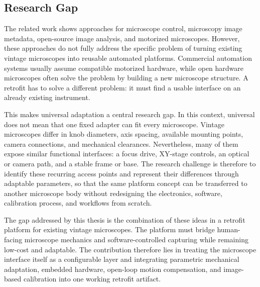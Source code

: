 \subsection{Research Gap}

The related work shows approaches for microscope control, microscopy image metadata, open-source image analysis, and motorized microscopes. However, these approaches do not fully address the specific problem of turning existing vintage microscopes into reusable automated platforms. Commercial automation systems usually assume compatible motorized hardware, while open hardware microscopes often solve the problem by building a new microscope structure. A retrofit has to solve a different problem: it must find a usable interface on an already existing instrument.

This makes universal adaptation a central research gap. In this context, universal does not mean that one fixed adapter can fit every microscope. Vintage microscopes differ in knob diameters, axis spacing, available mounting points, camera connections, and mechanical clearances. Nevertheless, many of them expose similar functional interfaces: a focus drive, XY-stage controls, an optical or camera path, and a stable frame or base. The research challenge is therefore to identify these recurring access points and represent their differences through adaptable parameters, so that the same platform concept can be transferred to another microscope body without redesigning the electronics, software, calibration process, and workflows from scratch.

The gap addressed by this thesis is the combination of these ideas in a retrofit platform for existing vintage microscopes. The platform must bridge human-facing microscope mechanics and software-controlled capturing while remaining low-cost and adaptable. The contribution therefore lies in treating the microscope interface itself as a configurable layer and integrating parametric mechanical adaptation, embedded hardware, open-loop motion compensation, and image-based calibration into one working retrofit artifact.
